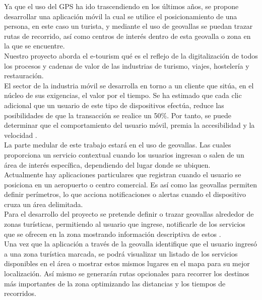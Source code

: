 \vspace*{7cm}
\rightline{{\Huge \textcolor{sectionColor}{Justificación}}}
\vspace*{2cm}


Ya que el uso del GPS ha ido trascendiendo en los últimos años, se propone desarrollar una aplicación móvil la cual se utilice el posicionamiento de una persona, en este caso un turista, y mediante el uso de geovallas se puedan trazar rutas de recorrido, así como centros de interés dentro de esta geovalla o zona en la que se encuentre. \\

Nuestro proyecto aborda el e-tourism qué es el reflejo de la digitalización de todos los procesos y cadenas de valor de las industrias de turismo, viajes, hostelería y restauración. \\

El sector de la industria móvil se desarrolla en torno a un cliente que sitúa, en el núcleo de sus exigencias, el valor por el tiempo. Se ha estimado que cada clic adicional que un usuario de este tipo de dispositivos efectúa, reduce las posibilidades de que la transacción se realice un 50\%. Por tanto, se puede determinar que el comportamiento del usuario móvil, premia la accesibilidad y la velocidad \cite{mtourism}. \\

La parte medular de este trabajo estará en el uso de geovallas. Las cuales proporciona un servicio contextual cuando los usuarios ingresan o salen de un área de interés específica, dependiendo del lugar donde se ubiquen. \\

Actualmente hay aplicaciones particulares que registran cuando el usuario se posiciona en un aeropuerto o centro comercial. Es así como las geovallas permiten definir perímetros, lo que acciona notificaciones o alertas cuando el dispositivo cruza un área delimitada.\\

Para el desarrollo del proyecto se pretende definir o trazar geovallas alrededor de zonas turísticas, permitiendo al usuario que ingrese, notificarle de los servicios que se ofrecen en la zona mostrando información descriptiva de estos \cite{mtourism}.\\

Una vez que la aplicación a través de la geovalla identifique que el usuario ingresó a una zona turística marcada, se podrá visualizar un listado de los servicios disponibles en el área o mostrar estos mismos lugares en el mapa para su mejor localización. Así mismo se generarán rutas opcionales para recorrer los destinos más importantes de la zona optimizando las distancias y los tiempos de recorridos.\\

